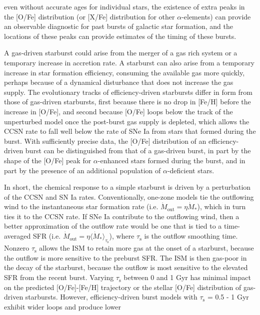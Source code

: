 even without accurate ages for individual stars, the existence of extra 
peaks in the [O/Fe] distribution (or [X/Fe] distribution for other 
$\alpha$-elements) can provide an observable diagnostic for past bursts of 
galactic star formation, and the locations of these peaks can provide 
estimates of the timing of these bursts. 
\par 
A gas-driven starburst could arise from the merger of a gas rich system or a 
temporary increase in accretion rate. A starburst can also arise from a 
temporary increase in star formation efficiency, consuming the available gas 
more quickly, perhaps because of a dynamical disturbance that does not 
increase the gas supply. The evolutionary tracks of efficiency-driven 
starbursts differ in form from those of gas-driven starbursts, first because 
there is no drop in [Fe/H] before the increase in [O/Fe], and second because 
[O/Fe] loops below the track of the unperturbed model once the post-burst 
gas supply is depleted, which allows the CCSN rate to fall well below the rate 
of SNe Ia from stars that formed during the burst. With sufficiently precise 
data, the [O/Fe] distribution of an efficiency-driven burst can be 
distinguished from that of a gas-driven burst, in part by the shape of the 
[O/Fe] peak for $\alpha$-enhanced stars formed during the burst, and in part 
by the presence of an additional population of $\alpha$-deficient stars. 
\par 
In short, the chemical response to a simple starburst is driven by a 
perturbation of the CCSN and SN Ia rates. Conventionally, one-zone models tie 
the outflowing wind to the instantaneous star formation rate (i.e. 
$\dot{M}_\text{out} = \eta\dot{M}_*$), which in turn ties it to the CCSN rate. 
If SNe Ia contribute to the outflowing wind, then a better approximation of 
the outflow rate would be one that is tied to a time-averaged SFR (i.e. 
$\dot{M}_\text{out} = \eta\langle\dot{M}_*\rangle_{\tau_\text{s}}$), where 
$\tau_\text{s}$ is the outflow smoothing time. Nonzero $\tau_\text{s}$ allows 
the ISM to retain more gas at the onset of a starburst, because the outflow is 
more sensitive to the preburst SFR. The ISM is then gas-poor in the decay of 
the starburst, because the outflow is most sensitive to the elevated SFR from 
the recent burst. Varying $\tau_\text{s}$ between 0 and 1 Gyr has minimal 
impact on the predicted [O/Fe]-[Fe/H] trajectory or the stellar [O/Fe] 
distribution of gas-driven starbursts. However, efficiency-driven burst models 
with $\tau_\text{s}$ = 0.5 - 1 Gyr exhibit wider loops and produce lower 
